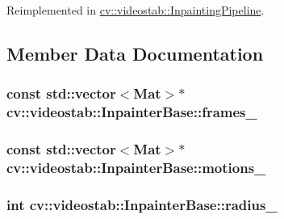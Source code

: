 Reimplemented in \hyperlink{classcv_1_1videostab_1_1InpaintingPipeline_ab8d0f36e30af37565ae460475aeed918}{cv\-::videostab\-::\-Inpainting\-Pipeline}.



\subsection{Member Data Documentation}
\hypertarget{classcv_1_1videostab_1_1InpainterBase_adc5085073fa501e61d8edfe5a34975c4}{
\subsubsection[{frames\-\_\-}]{\setlength{\rightskip}{0pt plus 5cm}const std\-::vector$<$Mat$>$$\ast$ cv\-::videostab\-::\-Inpainter\-Base\-::frames\-\_\-\hspace{0.3cm}{\ttfamily [protected]}}}\label{classcv_1_1videostab_1_1InpainterBase_adc5085073fa501e61d8edfe5a34975c4}
\hypertarget{classcv_1_1videostab_1_1InpainterBase_a464def3695a8ef1ff91666e896ee1005}{
\subsubsection[{motions\-\_\-}]{\setlength{\rightskip}{0pt plus 5cm}const std\-::vector$<$Mat$>$$\ast$ cv\-::videostab\-::\-Inpainter\-Base\-::motions\-\_\-\hspace{0.3cm}{\ttfamily [protected]}}}\label{classcv_1_1videostab_1_1InpainterBase_a464def3695a8ef1ff91666e896ee1005}
\hypertarget{classcv_1_1videostab_1_1InpainterBase_a2300c582c556d8e74329abe28f6d08ea}{
\subsubsection[{radius\-\_\-}]{\setlength{\rightskip}{0pt plus 5cm}int cv\-::videostab\-::\-Inpainter\-Base\-::radius\-\_\-\hspace{0.3cm}{\ttfamily [protected]}}}\label{classcv_1_1videostab_1_1InpainterBase_a2300c582c556d8e74329abe28f6d08ea}
